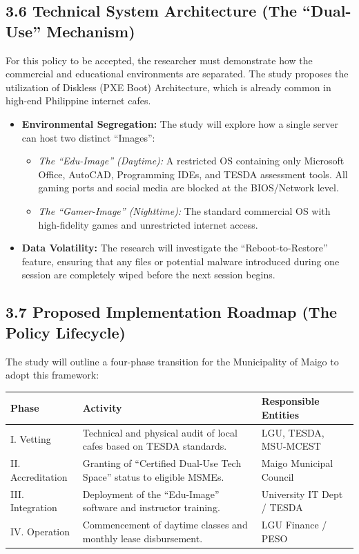 \subsection*{3.6 Technical System Architecture (The ``Dual-Use'' Mechanism)}
For this policy to be accepted, the researcher must demonstrate how the commercial and educational environments are separated. The study proposes the utilization of Diskless (PXE Boot) Architecture, which is already common in high-end Philippine internet cafes.
\begin{itemize}
    \item \textbf{Environmental Segregation:} The study will explore how a single server can host two distinct ``Images'':
    \begin{itemize}
        \item \textit{The ``Edu-Image'' (Daytime):} A restricted OS containing only Microsoft Office, AutoCAD, Programming IDEs, and TESDA assessment tools. All gaming ports and social media are blocked at the BIOS/Network level.
        \item \textit{The ``Gamer-Image'' (Nighttime):} The standard commercial OS with high-fidelity games and unrestricted internet access.
    \end{itemize}
    \item \textbf{Data Volatility:} The research will investigate the ``Reboot-to-Restore'' feature, ensuring that any files or potential malware introduced during one session are completely wiped before the next session begins.
\end{itemize}

\subsection*{3.7 Proposed Implementation Roadmap (The Policy Lifecycle)}
The study will outline a four-phase transition for the Municipality of Maigo to adopt this framework:

\begin{table}[h!]
\centering
\begin{tabular}{|l|p{7cm}|p{5cm}|}
\hline
\textbf{Phase} & \textbf{Activity} & \textbf{Responsible Entities} \\ \hline
I. Vetting & Technical and physical audit of local cafes based on TESDA standards. & LGU, TESDA, MSU-MCEST \\ \hline
II. Accreditation & Granting of ``Certified Dual-Use Tech Space'' status to eligible MSMEs. & Maigo Municipal Council \\ \hline
III. Integration & Deployment of the ``Edu-Image'' software and instructor training. & University IT Dept / TESDA \\ \hline
IV. Operation & Commencement of daytime classes and monthly lease disbursement. & LGU Finance / PESO \\ \hline
\end{tabular}
\end{table}

